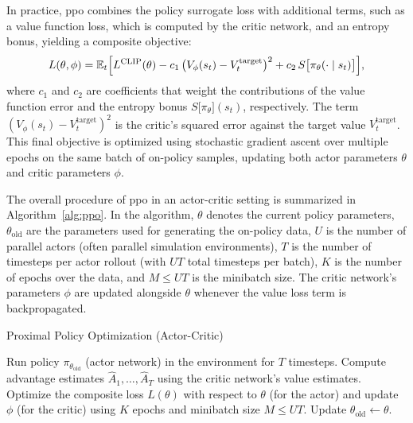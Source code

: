 In practice, \gls{ppo} combines the policy surrogate loss with additional terms, such as a value function loss, which is computed by the critic network, and an entropy bonus, yielding a composite objective:
\begin{equation}
L(\theta,\phi) = \mathbb{E}_t\Bigl[L^{\text{CLIP}}(\theta)
  - c_1\,\bigl(V_\phi(s_t) - V_t^{\text{target}}\bigr)^2
  + c_2\,S\bigl[\pi_\theta(\cdot\mid s_t)\bigr]\Bigr],
\end{equation}
where \(c_1\) and \(c_2\) are coefficients that weight the contributions of the value function error and the entropy bonus \(S\big[\pi_\theta\big](s_t)\), respectively. The term \(\left(V_\phi(s_t) - V_t^{\text{target}}\right)^2\) is the critic's squared error against the target value \(V_t^{\text{target}}\). This final objective is optimized using stochastic gradient ascent over multiple epochs on the same batch of on-policy samples, updating both actor parameters \(\theta\) and critic parameters \(\phi\).

The overall procedure of \gls{ppo} in an actor-critic setting is summarized in Algorithm~\ref{alg:ppo}. In the algorithm, \(\theta\) denotes the current policy parameters, \(\theta_{\text{old}}\) are the parameters used for generating the on-policy data, \(U\) is the number of parallel actors (often parallel simulation environments), \(T\) is the number of timesteps per actor rollout (with \(UT\) total timesteps per batch), \(K\) is the number of epochs over the data, and \(M \le UT\) is the minibatch size. The critic network's parameters \(\phi\) are updated alongside \(\theta\) whenever the value loss term is backpropagated.

\begin{algorithm}[H]
\caption{Proximal Policy Optimization (Actor-Critic)}
\label{alg:ppo}
\begin{algorithmic}[1]
        \State Run policy \(\pi_{\theta_{\text{old}}}\) (actor network) in the environment for \(T\) timesteps.
        \State Compute advantage estimates \(\hat{A}_1, \dots, \hat{A}_T\) using the critic network's value estimates.
    \EndFor
    \State Optimize the composite loss \(L(\theta)\) with respect to \(\theta\) (for the actor) and update \(\phi\) (for the critic) using \(K\) epochs and minibatch size \(M \le UT\).
    \State Update \(\theta_{\text{old}} \leftarrow \theta\).
\EndFor
\end{algorithmic}
\end{algorithm}

